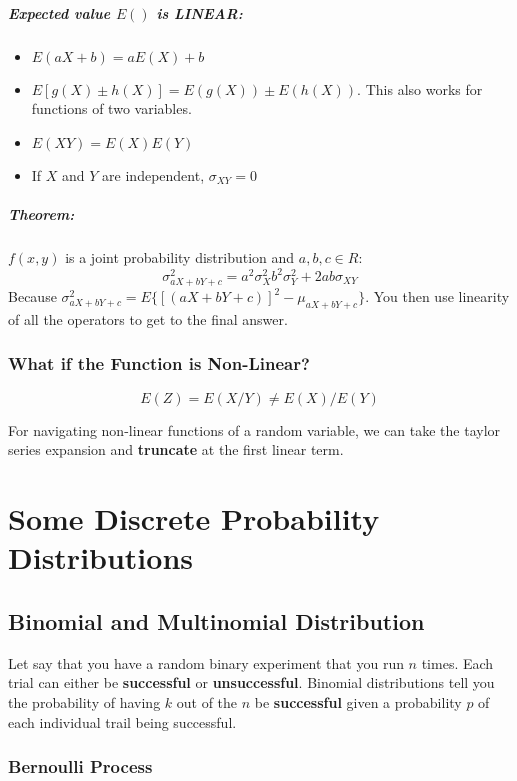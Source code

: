 \documentclass[a4paper,12pt]{report}
\begin{document}
\paragraph{Expected value $E()$ is LINEAR: } 
\begin{itemize}
\item $E(aX + b) = aE(X) + b$
\item $E[g(X) \pm h(X)] = E(g(X)) \pm E(h(X))$. This also works for functions of two variables.
\item $E(XY) = E(X)E(Y)$
\item If $X$ and $Y$ are independent, $\sigma_{XY} = 0$
\end{itemize}

\paragraph{Theorem: } $f(x, y)$ is a joint probability distribution and $a, b, c \in R$: 
$$\sigma^2_{aX+bY+c} = a^2\sigma^2_X b^2\sigma_Y^2 + 2ab\sigma_{XY}$$
Because $\sigma^2_{aX+bY+c} = E\{ [(aX + bY + c)]^2 - \mu_{aX+bY+c} \}$. You then use linearity of all the operators to get to the final answer.

\subsection{What if the Function is Non-Linear?}

$$E(Z) = E(X/Y) \neq E(X)/E(Y)$$

For navigating non-linear functions of a random variable, we can take the taylor series expansion and \textbf{truncate} at the first linear term.


\chapter{Some Discrete Probability Distributions}

\section{Binomial and Multinomial Distribution}

Let say that you have a random binary experiment that you run $n$ times. Each trial can either be \textbf{successful} or \textbf{unsuccessful}. Binomial distributions tell you the probability of having $k$ out of the $n$ be \textbf{successful} given a probability $p$ of each individual trail being successful.

\subsection{Bernoulli Process}
\end{document}
